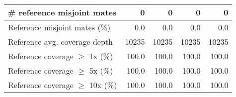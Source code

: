 \documentclass[12pt,a4paper]{article}
\begin{document}
\begin{table}[ht]
\begin{center}
\begin{tabular}{|l*{4}{|r}|}
\# reference misjoint mates & 0 & 0 & 0 & 0 \\ \hline
Reference misjoint mates (\%) & 0.0 & 0.0 & 0.0 & 0.0 \\ \hline
Reference avg. coverage depth & 10235 & 10235 & 10235 & 10235 \\ \hline
Reference coverage $\geq$ 1x (\%) & 100.0 & 100.0 & 100.0 & 100.0 \\ \hline
Reference coverage $\geq$ 5x (\%) & 100.0 & 100.0 & 100.0 & 100.0 \\ \hline
Reference coverage $\geq$ 10x (\%) & 100.0 & 100.0 & 100.0 & 100.0 \\ \hline
\end{tabular}
\end{center}
\end{table}
\end{document}

